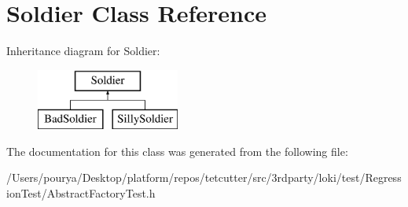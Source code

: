 \hypertarget{classSoldier}{}\section{Soldier Class Reference}
\label{classSoldier}
Inheritance diagram for Soldier\+:\begin{figure}[H]
\begin{center}
\leavevmode
\includegraphics[height=2.000000cm]{classSoldier}
\end{center}
\end{figure}


The documentation for this class was generated from the following file\+:\begin{DoxyCompactItemize}
\item 
/\+Users/pourya/\+Desktop/platform/repos/tetcutter/src/3rdparty/loki/test/\+Regression\+Test/Abstract\+Factory\+Test.\+h\end{DoxyCompactItemize}
